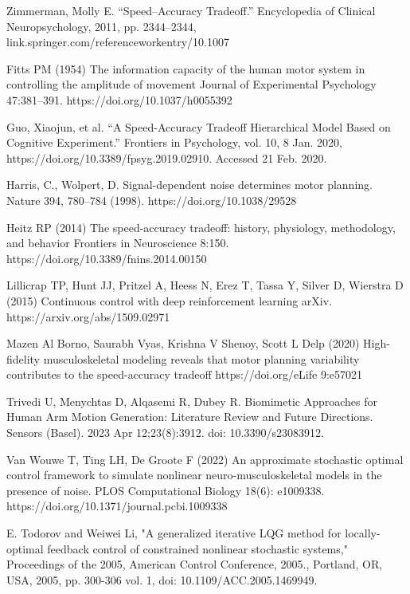 \documentclass[letterpaper, 10pt, conference]{ieeeconf}
\begin{document}
\begin{thebibliography}{99}
Zimmerman, Molly E. “Speed–Accuracy Tradeoff.” Encyclopedia of Clinical Neuropsychology, 2011, pp. 2344–2344, link.springer.com/referenceworkentry/10.1007%

Fitts PM (1954) The information capacity of the human motor system in controlling the amplitude of movement Journal of Experimental Psychology 47:381–391. https://doi.org/10.1037/h0055392 

Guo, Xiaojun, et al. “A Speed-Accuracy Tradeoff Hierarchical Model Based on Cognitive Experiment.” Frontiers in Psychology, vol. 10, 8 Jan. 2020, https://doi.org/10.3389/fpsyg.2019.02910. Accessed 21 Feb. 2020.

Harris, C., Wolpert, D. Signal-dependent noise determines motor planning. Nature 394, 780–784 (1998). https://doi.org/10.1038/29528

Heitz RP (2014) The speed-accuracy tradeoff: history, physiology, methodology, and behavior Frontiers in Neuroscience 8:150. https://doi.org/10.3389/fnins.2014.00150

Lillicrap TP, Hunt JJ, Pritzel A, Heess N, Erez T, Tassa Y, Silver D, Wierstra D (2015) Continuous control with deep reinforcement learning arXiv. https://arxiv.org/abs/1509.02971

Mazen Al Borno, Saurabh Vyas, Krishna V Shenoy, Scott L Delp (2020) High-fidelity musculoskeletal modeling reveals that motor planning variability contributes to the speed-accuracy tradeoff 
https://doi.org/eLife 9:e57021

Trivedi U, Menychtas D, Alqasemi R, Dubey R. Biomimetic Approaches for Human Arm Motion Generation: Literature Review and Future Directions. Sensors (Basel). 2023 Apr 12;23(8):3912. doi: 10.3390/s23083912.

Van Wouwe T, Ting LH, De Groote F (2022) An approximate stochastic optimal control framework to simulate nonlinear neuro-musculoskeletal models in the presence of noise. PLOS Computational Biology 18(6): e1009338. https://doi.org/10.1371/journal.pcbi.1009338

E. Todorov and Weiwei Li, "A generalized iterative LQG method for locally-optimal feedback control of constrained nonlinear stochastic systems," Proceedings of the 2005, American Control Conference, 2005., Portland, OR, USA, 2005, pp. 300-306 vol. 1, doi: 10.1109/ACC.2005.1469949.


\end{thebibliography}
\end{document}
